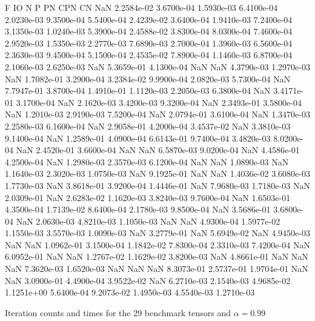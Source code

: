 \documentclass[10pt]{paper}
\begin{document}
\begin{table}
{	F IO N P PN CPN CN
          NaN   2.2584e-02   3.6700e-04   1.5930e-03   6.4100e-04   2.0230e-03   9.3500e-04
   5.5400e-04   2.4239e-02   3.6400e-04   1.9410e-03   7.2400e-04   3.1350e-03   1.0240e-03
   5.3900e-04   2.4588e-02   3.8300e-04   8.0300e-04   7.4600e-04   2.9520e-03   1.5350e-03
   2.2770e-03   7.6890e-03   2.7000e-04   1.3960e-03   6.5600e-04   2.3630e-03   9.4500e-04
   5.1500e-04   2.4535e-02   7.8900e-04   1.1460e-03   6.8700e-04   2.1060e-03   2.6250e-03
          NaN   5.3659e-01   4.1300e-04          NaN          NaN   4.3790e-03   1.2970e-03
          NaN   1.7082e-01   3.2900e-04   3.2384e-02   9.9900e-04   2.0820e-03   5.7300e-04
          NaN   7.7947e-01   3.8700e-04   1.4910e-01   1.1120e-03   2.2050e-03   6.3800e-04
          NaN   3.4171e-01   3.1700e-04          NaN   2.1620e-03   3.4200e-03   9.3200e-04
          NaN   2.3493e-01   3.5800e-04          NaN   1.2010e-03   2.9190e-03   7.5200e-04
          NaN   2.0794e-01   3.6100e-04          NaN   1.3470e-03   2.2580e-03   6.1600e-04
          NaN   2.9058e-01   4.2000e-04   3.4537e-02          NaN   3.3810e-03   9.1400e-04
          NaN   1.2589e-01   4.0900e-04   6.6143e-01   9.7400e-04   3.4820e-03   8.0200e-04
          NaN   2.4520e-01   3.6600e-04          NaN          NaN   6.5870e-03   9.0200e-04
          NaN   4.4586e-01   4.2500e-04          NaN   1.2980e-03   2.3570e-03   6.1200e-04
          NaN          NaN   1.0890e-03          NaN   1.1640e-03   2.3020e-03   1.0750e-03
          NaN   9.1925e-01          NaN          NaN   1.4036e-02   3.6080e-03   1.7730e-03
          NaN   3.8618e-01   3.9200e-04   1.4446e-01          NaN   7.9680e-03   1.7180e-03
          NaN   2.0309e-01          NaN   2.6283e-02   1.1620e-03   3.8240e-03   9.7600e-04
          NaN   1.6503e-01   4.3500e-04   1.7139e-02   8.6400e-04   2.1780e-03   9.8500e-04
          NaN   3.5686e-01   3.6800e-04          NaN   2.0630e-03   4.8210e-03   1.1050e-03
          NaN          NaN   4.9300e-04   1.5977e-02   1.1550e-03   3.5570e-03   1.0090e-03
          NaN   3.2779e-01          NaN   5.6949e-02          NaN   4.9450e-03          NaN
          NaN   1.0962e-01   3.1500e-04   1.1842e-02   7.8300e-04   2.3310e-03   7.4200e-04
          NaN   6.0952e-01          NaN          NaN   1.2767e-02   1.1629e-02   3.8200e-03
          NaN   4.8661e-01          NaN          NaN          NaN   7.3620e-03   1.6520e-03
          NaN          NaN          NaN   8.3073e-01   2.5737e-01   1.9704e-01          NaN
          NaN   3.0900e-01   4.4900e-04   3.9522e-02          NaN   6.2710e-03   2.1540e-03
   4.9685e-02   1.1251e+00   5.6400e-04   9.2073e-02   1.4950e-03   4.5540e-03   1.2710e-03
}	
	\caption{Iteration counts and times for the 29 benchmark tensors and $\alpha = 0.99$}
\end{table}
\end{document}
